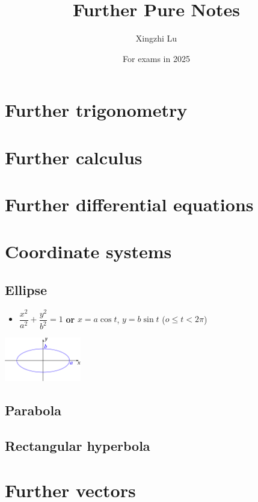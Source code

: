 \documentclass[11pt, A4paper]{article}
\title{Further Pure Notes}
\author{Xingzhi Lu}
\date{For exams in 2025}
\begin{document}
	\maketitle
	\section{Further trigonometry}
	
	
	
	\section{Further calculus}
	
	
	
	
	\section{Further differential equations}
	
	
	
	
	
	\section{Coordinate systems}
	\subsection{Ellipse}
	\begin{itemize}
		\item $\dfrac{x^2}{a^2}+\dfrac{y^2}{b^2}=1$ \textbf{or}  $x=a\cos t$, $y=b\sin t$ ($o\leq t < 2\pi$)
	\end{itemize}
	\includegraphics[width=0.25\textwidth]{ellipse}
	
	\subsection{Parabola}
	
	
	
	\subsection{Rectangular hyperbola}
	
	
	
	\section{Further vectors}
\end{document}
